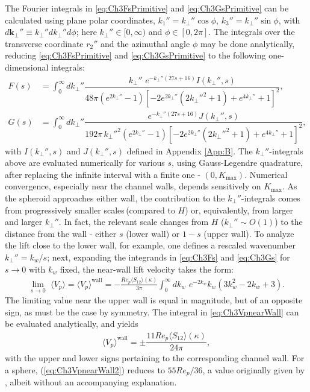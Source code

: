\documentclass{jfm}
\begin{document}
The Fourier integrals in \eqref{eq:Ch3FsPrimitive} and \eqref{eq:Ch3GsPrimitive} can be calculated using plane polar coordinates, $k_1''=k_\perp''\cos\phi$, $k_3''=k_\perp''\sin\phi$, with $d\bm{k}_\perp''\equiv k_\perp''dk_\perp''d\phi$; here $k_\perp''\in[0,\infty)$ and $\phi\in[0,2\pi]$. The integrals over the transverse coordinate $r_2''$ and the azimuthal angle $\phi$ may be done analytically, reducing \eqref{eq:Ch3FsPrimitive} and \eqref{eq:Ch3GsPrimitive} to the following one-dimensional integrals:
\begin{align}
F(s)&=\int_0^\infty dk_\perp'' \dfrac{k_\perp''\,\,e^{-k_\perp'' (27 s+16)} I(k_\perp'',s)}{48 \pi \left(e^{2 k_\perp''}-1\right) \left[-2 e^{2 k_\perp''} \left(2 k_\perp''^2+1\right)+e^{4 k_\perp''}+1\right]^2}\label{eq:Ch3Fs},\\ 
G(s)&=\int_0^\infty dk_\perp'' \dfrac{e^{-k_\perp'' (27 s+16)} J(k_\perp'',s)}{192 \pi\, k_\perp''^2 \left(e^{2 k_\perp''}-1\right) \left[-2 e^{2 k_\perp''} \left(2 k_\perp''^2+1\right)+e^{4 k_\perp''}+1\right]^2}\label{eq:Ch3Gs},
\end{align}
with $I(k_\perp'',s)$ and $J(k_\perp'',s)$ defined in Appendix \ref{App:B}. The $k_\perp''$-integrals above are evaluated numerically for various $s$, using Gauss-Legendre quadrature, after replacing the infinite interval with a finite one - $(0,K_\text{max})$. Numerical convergence, especially near the channel walls, depends sensitively on $K_\text{max}$. As the spheroid approaches either wall, the contribution to the $k_\perp''$-integrals comes from progressively smaller scales\,(compared to $H$) or, equivalently, from larger and larger $k_\perp''$. In fact, the relevant scale changes from $H$ ($k_\perp''\sim O(1)$) to the distance from the wall - either $s$ (lower wall) or $1-s$ (upper wall). To analyze the lift close to the lower wall, for example, one defines a rescaled wavenumber $k_\perp''=k_w/s$; next, expanding the integrands in \eqref{eq:Ch3Fs} and \eqref{eq:Ch3Gs} for $s\to0$ with $k_w$ fixed, the near-wall lift velocity takes the form:
\begin{align}
\lim_{s\to 0}\,\,\langle V_p\rangle=\langle V_p\rangle^\text{wall}= -\frac{Re_p\langle S_{12}\rangle(\kappa)}{3\pi} \int_0^\infty dk_w\,\, e^{-2 k_w} k_w (3 k_w^2-2 k_w+3).
\label{eq:Ch3VpnearWall}
\end{align}
The limiting value near the upper wall is equal in magnitude, but of an opposite sign, as must be the case by symmetry. The integral in \eqref{eq:Ch3VpnearWall} can be evaluated analytically, and yields 
\begin{align}
\langle V_p\rangle^\text{wall}= \pm \dfrac{11 Re_p\langle S_{12}\rangle(\kappa)}{24\pi},
\label{eq:Ch3VpnearWall2}
\end{align}
with the upper and lower signs pertaining to the corresponding channel wall.
For a sphere, (\ref{eq:Ch3VpnearWall2}) reduces to $55 Re_p/36$, a value originally given by \cite{vasseur1976}, albeit without an accompanying explanation.
\end{document}
